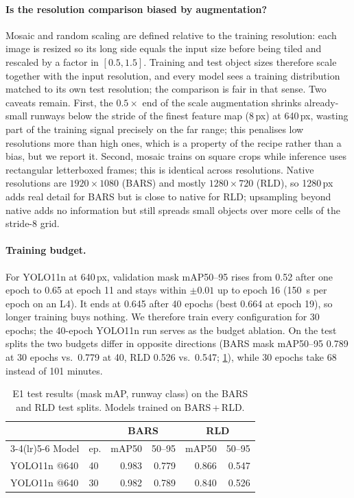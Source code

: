 \paragraph{Is the resolution comparison biased by augmentation?}
Mosaic and random scaling are defined relative to the training resolution: each image is resized so its long side equals the input size before being tiled and rescaled by a factor in $[0.5, 1.5]$.
Training and test object sizes therefore scale together with the input resolution, and every model sees a training distribution matched to its own test resolution; the comparison is fair in that sense.
Two caveats remain.
First, the $0.5\times$ end of the scale augmentation shrinks already-small runways below the stride of the finest feature map (8\,px) at 640\,px, wasting part of the training signal precisely on the far range; this penalises low resolutions more than high ones, which is a property of the recipe rather than a bias, but we report it.
Second, mosaic trains on square crops while inference uses rectangular letterboxed frames; this is identical across resolutions.
Native resolutions are $1920\times1080$ (BARS) and mostly $1280\times720$ (RLD), so 1280\,px adds real detail for BARS but is close to native for RLD; upsampling beyond native adds no information but still spreads small objects over more cells of the stride-8 grid.

\paragraph{Training budget.}
For YOLO11n at 640\,px, validation mask mAP50--95 rises from 0.52 after one epoch to 0.65 at epoch 11 and stays within $\pm0.01$ up to epoch 16 (\SI{150}{s} per epoch on an L4).
It ends at 0.645 after 40 epochs (best 0.664 at epoch 19), so longer training buys nothing.
We therefore train every configuration for 30 epochs; the 40-epoch YOLO11n run serves as the budget ablation.
On the test splits the two budgets differ in opposite directions (BARS mask mAP50--95 0.789 at 30 epochs vs.\ 0.779 at 40, RLD 0.526 vs.\ 0.547; \cref{tab:e1}), while 30 epochs take 68 instead of 101 minutes. 

\begin{table}[t]
\centering\small
\caption{E1 test results (mask mAP, runway class) on the BARS and RLD test splits. Models trained on BARS\,+\,RLD.}
\label{tab:e1}
\begin{tabular}{llrrrr}
\toprule
 & & \multicolumn{2}{c}{BARS} & \multicolumn{2}{c}{RLD} \\
\cmidrule(lr){3-4}\cmidrule(lr){5-6}
Model & ep. & mAP50 & 50--95 & mAP50 & 50--95 \\
\midrule
YOLO11n @640 & 40 & 0.983 & 0.779 & 0.866 & 0.547 \\
YOLO11n @640 & 30 & 0.982 & 0.789 & 0.840 & 0.526 \\
\bottomrule
\end{tabular}
\end{table}


